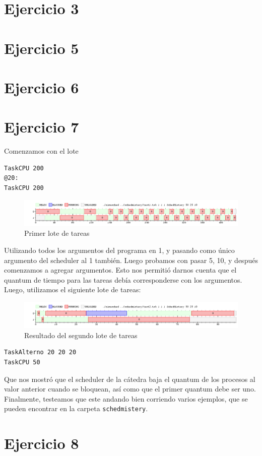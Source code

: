 \documentclass{article}
\begin{document}
\section{Ejercicio 3}



\section{Ejercicio 5}
\section{Ejercicio 6}

\section{Ejercicio 7}

Comenzamos con el lote

\begin{verbatim}
TaskCPU 200
@20:
TaskCPU 200
\end{verbatim}

\begin{figure}[h!]
\caption{Primer lote de tareas \label{grf:ex7-1}}
\centering
\includegraphics[width=15cm]{../ejercicios/ejercicio 7-1}
\end{figure}

Utilizando todos los argumentos del programa en 1, y pasando como único argumento del scheduler al 1 también. Luego probamos con pasar 5, 10, y después comenzamos a agregar argumentos. Esto nos permitió darnos cuenta que el quantum de tiempo para las tareas debía corresponderse con los argumentos. Luego, utilizamos el siguiente lote de tareas:

\begin{figure}[h!]
\caption{Resultado del segundo lote de tareas \label{grf:ex7-2}}
\centering
\includegraphics[width=15cm]{../ejercicios/ejercicio 7-2}
\end{figure}

\begin{verbatim}
TaskAlterno 20 20 20
TaskCPU 50
\end{verbatim}

Que nos mostró que el scheduler de la cátedra baja el quantum de los procesos al valor anterior cuando se bloquean, así como que el primer quantum debe ser uno. Finalmente, testeamos que este andando bien corriendo varios ejemplos, que se pueden encontrar en la carpeta \verb`schedmistery`.

\section{Ejercicio 8}
\end{document}
